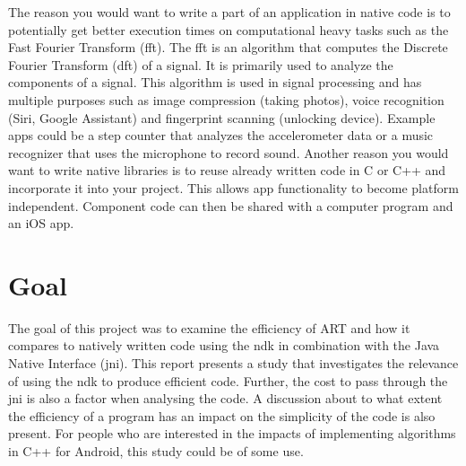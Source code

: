 The reason you would want to write a part of an application in native code is to potentially get better execution times on computational heavy tasks such as the Fast Fourier Transform (\gls{fft}). The \gls{fft} is an algorithm that computes the Discrete Fourier Transform (\gls{dft}) of a signal. It is primarily used to analyze the components of a signal. This algorithm is used in signal processing and has multiple purposes such as image compression (taking photos), voice recognition (Siri, Google Assistant) and fingerprint scanning (unlocking device). Example apps could be a step counter that analyzes the accelerometer data or a music recognizer that uses the microphone to record sound. Another reason you would want to write native libraries is to reuse already written code in C or C++ and incorporate it into your project. This allows app functionality to become platform independent. Component code can then be shared with a computer program and an iOS app.


\section{Goal}
The goal of this project was to examine the efficiency of ART and how it compares to natively written code using the \gls{ndk} in combination with the Java Native Interface (\gls{jni}). This report presents a study that investigates the relevance of using the \gls{ndk} to produce efficient code. Further, the cost to pass through the \gls{jni} is also a factor when analysing the code. A discussion about to what extent the efficiency of a program has an impact on the simplicity of the code is also present. For people who are interested in the impacts of implementing algorithms in C++ for Android, this study could be of some use.

